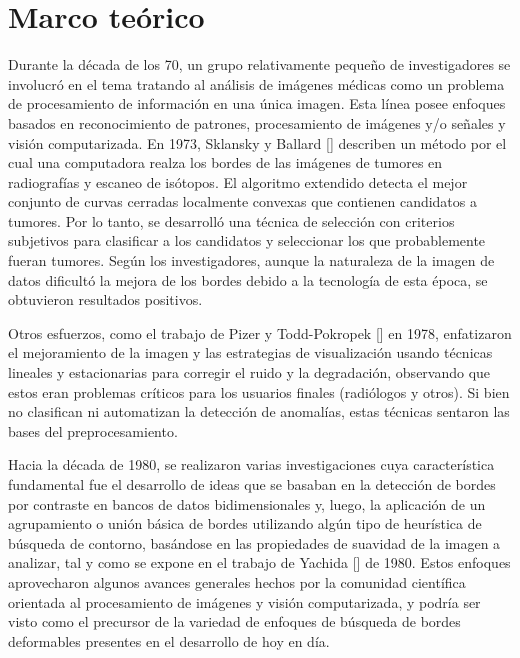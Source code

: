 \chapter{Marco te\'orico}\label{chapter:state-of-the-art}

\par Durante la d\'ecada de los 70, un grupo relativamente pequeño de investigadores se involucró en el tema tratando al análisis de imágenes m\'edicas como un problema de procesamiento de información en una única imagen. Esta l\'inea posee enfoques basados en reconocimiento de patrones, procesamiento de imágenes y/o señales y visión computarizada. En 1973, Sklansky y Ballard [\cite{1}] describen un m\'etodo por el cual una computadora realza los bordes de las imágenes de tumores en radiografías y escaneo de isótopos. El algoritmo extendido detecta el mejor conjunto de curvas cerradas localmente convexas que contienen candidatos a tumores. Por lo tanto, se desarrolló una técnica de selección con criterios subjetivos para clasificar a los candidatos y seleccionar los que probablemente fueran tumores. Seg\'un los investigadores, aunque la naturaleza de la imagen de datos dificultó la mejora de los bordes debido a la tecnolog\'ia de esta \'epoca, se obtuvieron resultados positivos.

\par Otros esfuerzos, como el trabajo de Pizer y Todd-Pokropek [\cite{2}] en 1978, enfatizaron el mejoramiento de la imagen y las estrategias de visualización usando t\'ecnicas lineales y estacionarias para corregir el ruido y la degradaci\'on, observando que estos eran problemas críticos para los usuarios finales (radiólogos y otros). Si bien no clasifican ni automatizan la detecci\'on de anomal\'ias, estas t\'ecnicas sentaron las bases del preprocesamiento.

\par Hacia la d\'ecada de 1980, se realizaron varias investigaciones cuya caracter\'istica fundamental fue el desarrollo de ideas que se basaban en la detecci\'on de bordes por contraste en bancos de datos bidimensionales y, luego, la aplicaci\'on de un agrupamiento o uni\'on b\'asica de bordes utilizando algún tipo de heurística de búsqueda de contorno, basándose en las propiedades de suavidad de la imagen a analizar, tal y como se expone en el trabajo de Yachida [\textcolor{cyan}{\cite{3}}] de 1980. Estos enfoques aprovecharon algunos avances generales hechos por la comunidad científica orientada al procesamiento de imágenes y visión computarizada, y podría ser visto como el precursor de la variedad de enfoques de búsqueda de bordes deformables presentes en el desarrollo de hoy en día.

